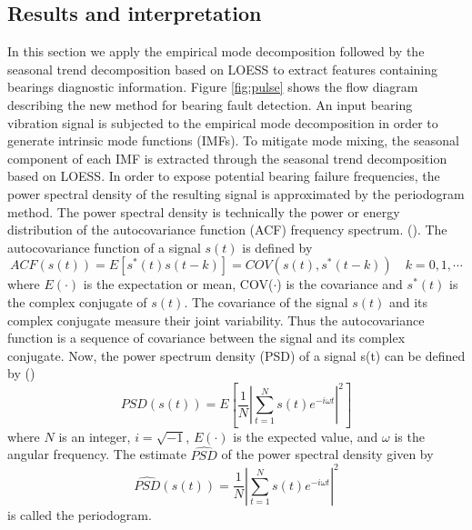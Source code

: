 \documentclass[../Main/thesis.tex]{subfiles}
\begin{document}
\subsection{Results and interpretation}
In this section we apply the empirical mode decomposition followed by the seasonal trend decomposition based on LOESS to extract features containing bearings diagnostic information.
Figure \ref{fig:pulse} shows the flow diagram describing the new method for bearing fault detection.
\justify
An input bearing vibration signal is subjected to the empirical mode decomposition in order to generate intrinsic mode functions (IMFs). To mitigate mode mixing, the seasonal component of each IMF is extracted through the seasonal trend decomposition based on LOESS. In order to expose potential bearing failure frequencies, the power spectral density of the resulting signal is approximated by the periodogram method.
\justify
The power spectral density is technically the power or energy distribution of the autocovariance function (ACF) frequency spectrum. (\cite{stoica2004}). The autocovariance function of a signal $s(t)$ is defined by 
\begin{equation}
	ACF(s(t)) = E\left[ s^{*}(t)s(t-k) \right] = COV\left(s(t), s^{*}(t-k)\right)\quad k = 0,1, \cdots
\end{equation}
where $E(\cdot)$ is the expectation or mean, COV($\cdot$) is the covariance and $s^{*}(t)$ is the complex conjugate of $s(t)$. The covariance of the signal $s(t)$ and its complex conjugate measure their joint variability. Thus the autocovariance function is a sequence of covariance between the signal and its complex conjugate. Now, the power spectrum density (PSD) of a signal s(t) can be defined by (\cite{stoica2004})
\begin{equation}\label{eq:psd}
	PSD\left(s(t)\right) = E\left[ \frac{1}{N} \left\vert \sum_{t=1}^{N} s(t)e^{-i\omega t}\right\vert^{2}   \right]
\end{equation}
where $N$ is an integer, $i=\sqrt{-1}$, $E(\cdot)$ is the expected value, and $\omega$ is the angular frequency. The estimate $\widehat{PSD}$ of the power spectral density given by
\begin{equation}
		\widehat{PSD}\left(s(t)\right) =  \frac{1}{N} \left\vert \sum_{t=1}^{N} s(t)e^{-i\omega t}\right\vert^{2}
\end{equation}
is called the periodogram.
\end{document}
